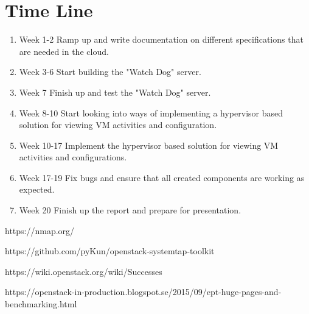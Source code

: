 \documentclass[12pt]{article}
\begin{document}
\section{Time Line}
\begin{enumerate}
    \item Week 1-2 Ramp up and write documentation on different specifications that are needed in the cloud.
    \item Week 3-6 Start building the "Watch Dog" server.
    \item Week 7 Finish up and test the "Watch Dog" server.
    \item Week 8-10 Start looking into ways of implementing a hypervisor based solution for viewing VM activities and configuration.
    \item Week 10-17 Implement the hypervisor based solution for viewing VM activities and configurations.
    \item Week 17-19 Fix bugs and ensure that all created components are working as expected.
    \item Week 20 Finish up the report and prepare for presentation.
\end{enumerate}

\begin{thebibliography}{1}

    https://nmap.org/

    https://github.com/pyKun/openstack-systemtap-toolkit

    https://wiki.openstack.org/wiki/Successes

    https://openstack-in-production.blogspot.se/2015/09/ept-huge-pages-and-benchmarking.html

\end{thebibliography}
\end{document}
